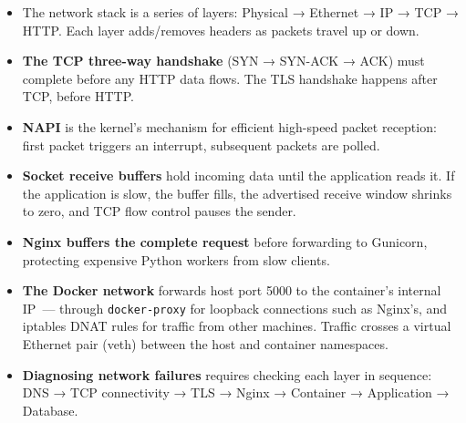 \label{26-network-stack-flow:key-takeaways}
\begin{takeaways}

\begin{itemize}
\tightlist
\item
  The network stack is a series of layers: Physical → Ethernet → IP → TCP → HTTP. Each layer adds/removes headers as packets travel up or down.
\item
  \textbf{The TCP three-way handshake} (SYN → SYN-ACK → ACK) must complete before any HTTP data flows. The TLS handshake happens after TCP, before HTTP.
\item
  \textbf{NAPI} is the kernel's mechanism for efficient high-speed packet reception: first packet triggers an interrupt, subsequent packets are polled.
\item
  \textbf{Socket receive buffers} hold incoming data until the application reads it. If the application is slow, the buffer fills, the advertised receive window shrinks to zero, and TCP flow control pauses the sender.
\item
  \textbf{Nginx buffers the complete request} before forwarding to Gunicorn, protecting expensive Python workers from slow clients.
\item
  \textbf{The Docker network} forwards host port 5000 to the container's internal IP~--- through \texttt{docker-proxy} for loopback connections such as Nginx's, and iptables DNAT rules for traffic from other machines. Traffic crosses a virtual Ethernet pair (veth) between the host and container namespaces.
\item
  \textbf{Diagnosing network failures} requires checking each layer in sequence: DNS → TCP connectivity → TLS → Nginx → Container → Application → Database.
\end{itemize}

\end{takeaways}

\label{26-network-stack-flow:exercises}

